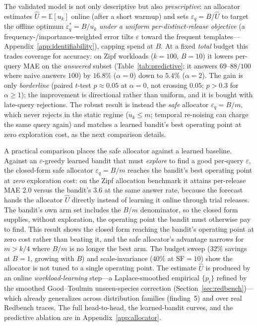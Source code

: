 \documentclass[sigconf,nonacm]{acmart}
\newcommand{\eps}{\varepsilon}
\newcommand{\E}{\mathbb{E}}
\begin{document}
The validated model is not only descriptive but also \emph{prescriptive}: an allocator estimates $\hat U=\E[u_k]$ online (after a short warmup) and sets $\eps_q=B/\hat U$ to target the offline optimum $\eps_q^*=B/u_k$ \emph{under a uniform per-distinct-release objective} (a frequency-/importance-weighted error tilts $\eps$ toward the frequent templates---Appendix~\ref{app:identifiability}), capping spend at $B$. At a fixed \emph{total} budget this trades coverage for accuracy: on Zipf workloads ($k{=}100$, $B{=}10$) it lowers per-query MAE on the \emph{answered} subset (Table~\ref{tab:predictive}; it answers $69$--$88/100$ where naive answers $100$) by $16.8\%$ ($\alpha{=}0$) down to $5.4\%$ ($\alpha{=}2$). The gain is only \emph{borderline} (paired $t$-test $p\approx0.05$ at $\alpha{=}0$, not crossing $0.05$; $p>0.3$ for $\alpha\ge1$); the improvement is directional rather than uniform, and it is bought with late-query rejections. The robust result is instead the \emph{safe} allocator $\eps_q{=}B/m$, which never rejects in the static regime ($u_k\le m$; temporal re-noising can charge the same query again) and matches a learned bandit's best operating point at zero exploration cost, as the next comparison details.

A practical comparison places the safe allocator against a learned baseline. Against an $\eps$-greedy learned bandit that must \emph{explore} to find a good per-query $\eps$, the closed-form safe allocator $\eps_q{=}B/m$ reaches the bandit's best operating point at \emph{zero} exploration cost: on the Zipf allocation benchmark it attains per-release MAE $2.0$ versus the bandit's $3.6$ at the same answer rate, because the forecast hands the allocator $\hat U$ directly instead of learning it online through trial releases. The bandit's own arm set includes the $B/m$ denominator, so the closed form supplies, without exploration, the operating point the bandit must otherwise pay to find. This result shows the closed form reaching the bandit's operating point at zero cost rather than beating it, and the safe allocator's advantage narrows for $m{>}k/4$ where $B/m$ is no longer the best arm. The budget sweep ($32\%$ savings at $B{=}1$, growing with $B$) and scale-invariance ($40\%$ at SF$=10$) show the allocator is not tuned to a single operating point. The estimate $\hat U$ is produced by an online \emph{workload-learning} step---a Laplace-smoothed empirical $\{p_i\}$ refined by the smoothed Good--Toulmin unseen-species correction (Section~\ref{sec:redbench})---which already generalizes across distribution families (finding~5) and over real Redbench traces. The full head-to-head, the learned-bandit curves, and the predictive ablation are in Appendix~\ref{app:allocator}.
\end{document}
